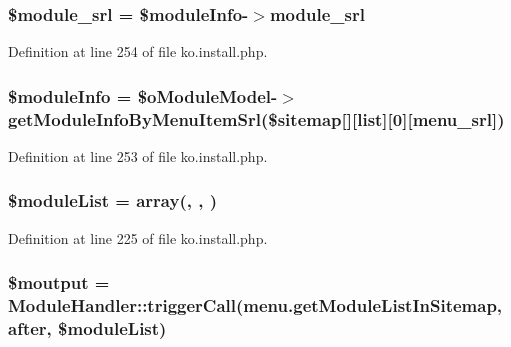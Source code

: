 \subsubsection[{\$module\+\_\+srl}]{\setlength{\rightskip}{0pt plus 5cm}\${\bf module\+\_\+srl} = \$module\+Info-\/$>${\bf module\+\_\+srl}}\label{ko_8install_8php_ae40aed4d7a99050245e66ca2a82949ed}


Definition at line 254 of file ko.\+install.\+php.

\hypertarget{ko_8install_8php_ae3552a6dd49f37a50e7858151f7c5cc2}{}
\subsubsection[{\$module\+Info}]{\setlength{\rightskip}{0pt plus 5cm}\$module\+Info = \$o\+Module\+Model-\/$>$get\+Module\+Info\+By\+Menu\+Item\+Srl(\$sitemap\mbox{[}\textquotesingle{}\mbox{]}\mbox{[}\textquotesingle{}list\textquotesingle{}\mbox{]}\mbox{[}0\mbox{]}\mbox{[}\textquotesingle{}menu\+\_\+srl\textquotesingle{}\mbox{]})}\label{ko_8install_8php_ae3552a6dd49f37a50e7858151f7c5cc2}


Definition at line 253 of file ko.\+install.\+php.

\hypertarget{ko_8install_8php_aaa80946d50e2d3677fbbc6d6c8a643c3}{}
\subsubsection[{\$module\+List}]{\setlength{\rightskip}{0pt plus 5cm}\$module\+List = array(\textquotesingle{}, \textquotesingle{}, \textquotesingle{})}\label{ko_8install_8php_aaa80946d50e2d3677fbbc6d6c8a643c3}


Definition at line 225 of file ko.\+install.\+php.

\hypertarget{ko_8install_8php_a2598d068355cca17645bc6bd70cc3a8c}{}
\subsubsection[{\$moutput}]{\setlength{\rightskip}{0pt plus 5cm}\$moutput = {\bf Module\+Handler\+::trigger\+Call}(\textquotesingle{}menu.\+get\+Module\+List\+In\+Sitemap\textquotesingle{}, \textquotesingle{}after\textquotesingle{}, \$module\+List)}\label{ko_8install_8php_a2598d068355cca17645bc6bd70cc3a8c}


